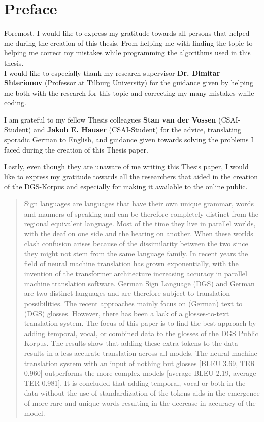 
\section*{Preface}

Foremost, I would like to express my gratitude towards all persons that helped me during the creation of this thesis. From helping me with finding the topic to helping me correct my mistakes while programming the algorithms used in this thesis. 
\\

I would like to especially thank my research supervisor \textbf{Dr. Dimitar Shterionov} (Professor at Tilburg University) for the guidance given by helping me both with the research for this topic and correcting my many mistakes while coding. 

I am grateful to my fellow Thesis colleagues \textbf{Stan van der Vossen} (CSAI-Student) and \textbf{Jakob E. Hauser} (CSAI-Student) for the advice, translating sporadic German to English, and guidance given towards solving the problems I faced during the creation of this Thesis paper.

Lastly, even though they are unaware of me writing this Thesis paper, I would like to express my gratitude towards all the researchers that aided in the creation of the DGS-Korpus and especially for making it available to the online public.


\begin{abstract}

Sign languages are languages that have their own unique grammar, words and manners of speaking and can be therefore completely distinct from the regional equivalent language. Most of the time they live in parallel worlds, with the deaf on one side and the hearing on another. When these worlds clash confusion arises because of the dissimilarity between the two since they might not stem from the same language family. In recent years the field of neural machine translation has grown exponentially, with the invention of the transformer architecture increasing accuracy in parallel machine translation software. German Sign Language (DGS) and German are two distinct languages and are therefore subject to translation possibilities. The recent approaches mainly focus on (German) text to (DGS) glosses. However,  there has been a lack of a glosses-to-text translation system. The focus of this paper is to find the best approach by adding temporal, vocal, or combined data to the glosses of the DGS Public Korpus. The results show that adding these extra tokens to the data results in a less accurate translation across all models. The neural machine translation system with an input of nothing but glosses [BLEU 3.69, TER 0.960] outperforms the more complex models [average BLEU 2.19, average TER 0.981]. It is concluded that adding temporal, vocal or both in the data without the use of standardization of the tokens aids in the emergence of more rare and unique words resulting in the decrease in accuracy of the model.

\end{abstract}

